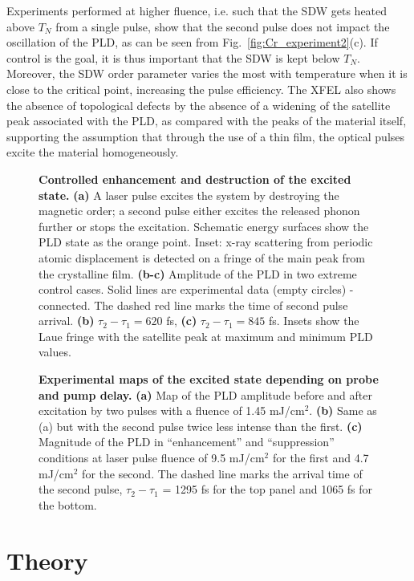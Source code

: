 Experiments performed at higher fluence, i.e. such that the SDW gets heated above $T_N$ from a single pulse, show that the second pulse does not impact the oscillation of the PLD, as can be seen from Fig.~\ref{fig:Cr_experiment2}(c).
If control is the goal, it is thus important that the SDW is kept below $T_N$.
Moreover, the SDW order parameter varies the most with temperature when it is close to the critical point, increasing the pulse efficiency.
The XFEL also shows the absence of topological defects by the absence of a widening of the satellite peak associated with the PLD, as compared with the peaks of the material itself, supporting the assumption that through the use of a thin film, the optical pulses excite the material homogeneously. 
\begin{figure}
\caption{\label{fig:Cr_experimental}{\bf Controlled enhancement and destruction of the excited state.} {\bf (a)} A laser pulse excites the system by destroying the magnetic order; a second pulse either excites the released phonon further or stops the excitation. Schematic energy surfaces show the PLD state as the orange point. Inset: x-ray scattering from periodic atomic displacement is detected on a fringe of the main peak from the crystalline film. {\bf (b-c)} Amplitude of the PLD in two extreme control cases. Solid lines are experimental data (empty circles) - connected. The dashed red line marks the time of second pulse arrival. {\bf (b)} $\tau_2 - \tau_1 = 620$ fs, {\bf (c)} $\tau_2 - \tau_1 = 845$ fs. Insets show the Laue fringe with the satellite peak at maximum and minimum PLD values.}
\end{figure}
\begin{figure}
\caption{\label{fig:Cr_experimental2}{\bf Experimental maps of the excited state depending on probe and pump delay.} { \bf (a)} Map of the PLD amplitude before and after excitation by two pulses with a fluence of 1.45 mJ/cm$^2$. {\bf (b)} Same as (a) but with the second pulse twice less intense than the first. {\bf (c)} Magnitude of the PLD in ``enhancement'' and ``suppression'' conditions at laser pulse fluence of 9.5 mJ/cm$^2$ for the first and 4.7 mJ/cm$^2$ for the second. The dashed line marks the arrival time of the second pulse, $\tau_2 - \tau_1$ = 1295 fs for the top panel and 1065 fs for the bottom.}
\end{figure}

\section{Theory}

